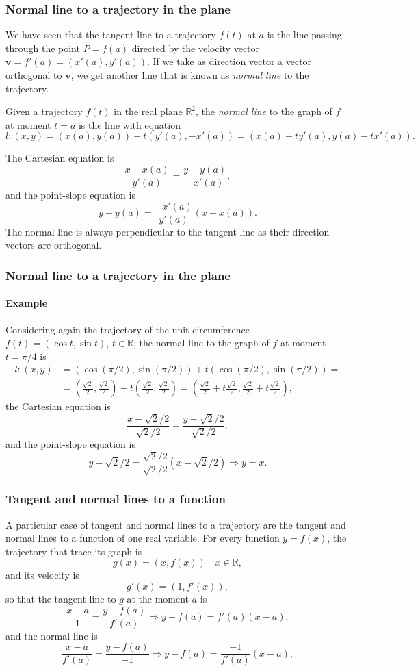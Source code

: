 \begin{frame}
\frametitle{Normal line to a trajectory in the plane}
We have seen that the tangent line to a trajectory $f(t)$ at $a$ is the line passing through the point
$P=f(a)$ directed by the velocity vector $\mathbf{v}=f'(a)=(x'(a),y'(a))$.
If we take as direction vector a vector orthogonal to $\mathbf{v}$, we get another line that is known as \emph{normal line} to the trajectory.
\begin{definition}
Given a trajectory $f(t)$ in the real plane $\mathbb{R}^2$, the \emph{normal line} to the graph of $f$ at moment $t=a$ is the line with equation
\[
l: (x,y)=(x(a),y(a))+t(y'(a),-x'(a)) = (x(a)+ty'(a),y(a)-tx'(a)).
\]
\end{definition}
The Cartesian equation is
\[
\frac{x-x(a)}{y'(a)} = \frac{y-y(a)}{-x'(a)},
\]
and the point-slope equation is
\[
y-y(a) = \frac{-x'(a)}{y'(a)}(x-x(a)).
\]
The normal line is always perpendicular to the tangent line as their direction vectors are orthogonal.
\end{frame}


\begin{frame}
\frametitle{Normal line to a trajectory in the plane}
\framesubtitle{Example}
Considering again the trajectory of the unit circumference $f(t) = (\cos t,\sin t)$, $t\in \mathbb{R}$, the normal line to the graph of $f$ at moment $t=\pi/4$ is
\begin{align*}
l: (x,y)&=(\cos(\pi/2),\sin(\pi/2))+t(\cos(\pi/2),\sin(\pi/2)) =\\
&= \left(\frac{\sqrt{2}}{2},\frac{\sqrt{2}}{2}\right)+t\left(\frac{\sqrt{2}}{2},\frac{\sqrt{2}}{2}\right)
=\left(\frac{\sqrt{2}}{2}+t\frac{\sqrt{2}}{2},\frac{\sqrt{2}}{2}+t\frac{\sqrt{2}}{2}\right),
\end{align*}
the Cartesian equation is
\[
\frac{x-\sqrt{2}/2}{\sqrt{2}/2} = \frac{y-\sqrt{2}/2}{\sqrt{2}/2},
\]
and the point-slope equation is
\[
y-\sqrt{2}/2 = \frac{\sqrt{2}/2}{\sqrt{2}/2}(x-\sqrt{2}/2) \Rightarrow y=x.
\]
\end{frame}


\begin{frame}
\frametitle{Tangent and normal lines to a function}
A particular case of tangent and normal lines to a trajectory are the tangent and normal lines to a function of one real variable.
For every function $y=f(x)$, the trajectory that trace its graph is
\[
g(x) = (x,f(x))  \quad x\in \mathbb{R},
\]
and its velocity is
\[
g'(x) = (1,f'(x)),
\]
so that the tangent line to $g$ at the moment $a$ is
\[
\frac{x-a}{1} = \frac{y-f(a)}{f'(a)} \Rightarrow y-f(a) = f'(a)(x-a),
\]
and the normal line is
\[
\frac{x-a}{f'(a)} = \frac{y-f(a)}{-1} \Rightarrow y-f(a) = \frac{-1}{f'(a)}(x-a),
\]
\end{frame}


